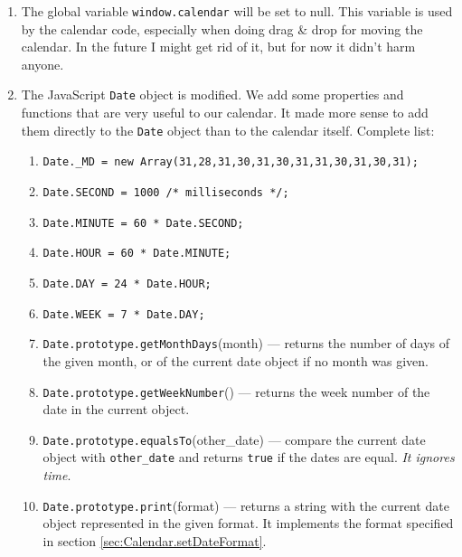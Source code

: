 \documentclass[a4paper,10pt]{article}
\begin{document}
\begin{enumerate}

\item The global variable \texttt{window.calendar} will be set to null.  This
variable is used by the calendar code, especially when doing drag \& drop for
moving the calendar.  In the future I might get rid of it, but for now it
didn't harm anyone.

\item The JavaScript \texttt{Date} object is modified.  We add some properties
and functions that are very useful to our calendar.  It made more sense to add
them directly to the \texttt{Date} object than to the calendar itself.
Complete list:

\begin{enumerate}

\item \texttt{Date.\_MD    = new Array(31,28,31,30,31,30,31,31,30,31,30,31);}
\item \texttt{Date.SECOND = 1000 /* milliseconds */;}
\item \texttt{Date.MINUTE = 60 * Date.SECOND;}
\item \texttt{Date.HOUR   = 60 * Date.MINUTE;}
\item \texttt{Date.DAY    = 24 * Date.HOUR;}
\item \texttt{Date.WEEK   =  7 * Date.DAY;}

\item \texttt{Date.prototype.getMonthDays}(month) --- returns the number of days
of the given month, or of the current date object if no month was given.

\item \texttt{Date.prototype.getWeekNumber}() --- returns the week number of the
date in the current object.

\item \texttt{Date.prototype.equalsTo}(other\_date) --- compare the current date
object with \texttt{other\_date} and returns \texttt{true} if the dates are
equal.  \emph{It ignores time}.

\item \texttt{Date.prototype.print}(format) --- returns a string with the
current date object represented in the given format.  It implements the format
specified in section \ref{sec:Calendar.setDateFormat}.

\end{enumerate}

\end{enumerate}
\end{document}

